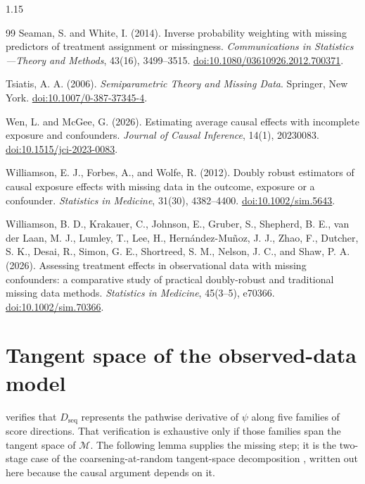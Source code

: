 \documentclass[11pt]{article}
\theoremstyle{definition}
\newcommand{\1}{\mathbf{1}}
\newcommand{\seq}{\mathrm{seq}}
\begin{document}
\begin{spacing}{1.15}
\begin{thebibliography}{99}
Seaman, S. and White, I. (2014).
Inverse probability weighting with missing predictors of treatment assignment or missingness.
\emph{Communications in Statistics---Theory and Methods}, 43(16), 3499--3515.
\href{https://doi.org/10.1080/03610926.2012.700371}{doi:10.1080/03610926.2012.700371}.

Tsiatis, A. A. (2006).
\emph{Semiparametric Theory and Missing Data}.
Springer, New York.
\href{https://doi.org/10.1007/0-387-37345-4}{doi:10.1007/0-387-37345-4}.

Wen, L. and McGee, G. (2026).
Estimating average causal effects with incomplete exposure and confounders.
\emph{Journal of Causal Inference}, 14(1), 20230083.
\href{https://doi.org/10.1515/jci-2023-0083}{doi:10.1515/jci-2023-0083}.

Williamson, E. J., Forbes, A., and Wolfe, R. (2012).
Doubly robust estimators of causal exposure effects with missing data in the outcome, exposure or a confounder.
\emph{Statistics in Medicine}, 31(30), 4382--4400.
\href{https://doi.org/10.1002/sim.5643}{doi:10.1002/sim.5643}.

Williamson, B. D., Krakauer, C., Johnson, E., Gruber, S., Shepherd, B. E., van der Laan, M. J., Lumley, T., Lee, H., Hernández-Muñoz, J. J., Zhao, F., Dutcher, S. K., Desai, R., Simon, G. E., Shortreed, S. M., Nelson, J. C., and Shaw, P. A. (2026).
Assessing treatment effects in observational data with missing confounders: a comparative study of practical doubly-robust and traditional missing data methods.
\emph{Statistics in Medicine}, 45(3--5), e70366.
\href{https://doi.org/10.1002/sim.70366}{doi:10.1002/sim.70366}.

\end{thebibliography}
\end{spacing}
\endgroup

\appendix
\bigskip
\section{Tangent space of the observed-data model}\label{app:tangent}

 verifies that $D_{\seq}$ represents the pathwise derivative of
$\psi$ along five families of score directions. That verification is exhaustive
only if those families span the tangent space of $\mathcal M$. The following
lemma supplies the missing step; it is the two-stage case of the
coarsening-at-random tangent-space decomposition
\citep{rrz1994,gill1997,tsiatis2006}, written out here because the causal
argument depends on it.
\end{document}
